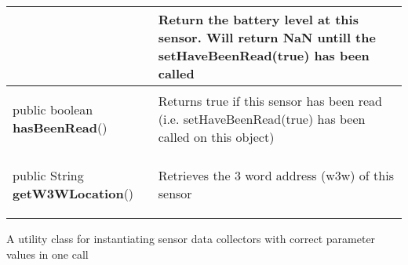 {\begin{tabularx}{\linewidth}{X|m{}}
\begin{raggedleft}
\end{raggedleft} &
 Return the battery level at this sensor. Will return NaN untill the setHaveBeenRead(true) has been called\\ \hline 
\begin{raggedleft}public boolean \textbf{hasBeenRead}()
\end{raggedleft} &
 Returns true if this sensor has been read (i.e. setHaveBeenRead(true) has been called on this object)\\ \hline 
\begin{raggedleft}public String \textbf{getW3WLocation}()
\end{raggedleft} &
 Retrieves the 3 word address (w3w) of this sensor\\\end{tabularx}
}
 {\scriptsize A utility class for instantiating sensor data collectors with correct parameter values in one call
 
}
